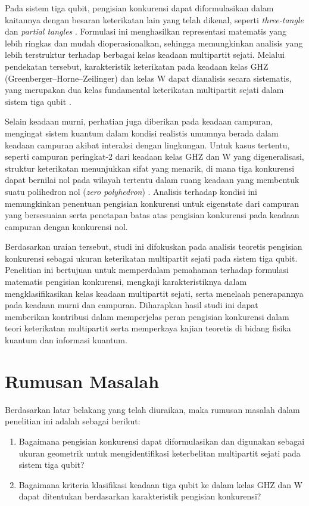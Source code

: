 \par
Pada sistem tiga qubit, pengisian konkurensi dapat diformulasikan dalam kaitannya dengan besaran keterikatan lain yang telah dikenal, seperti \textit{three-tangle} dan \textit{partial tangles} \cite{coffman2000distributed}. Formulasi ini menghasilkan representasi matematis yang lebih ringkas dan mudah dioperasionalkan, sehingga memungkinkan analisis yang lebih terstruktur terhadap berbagai kelas keadaan multipartit sejati. Melalui pendekatan tersebut, karakteristik keterikatan pada keadaan kelas GHZ (Greenberger--Horne--Zeilinger) dan kelas W dapat dianalisis secara sistematis, yang merupakan dua kelas fundamental keterikatan multipartit sejati dalam sistem tiga qubit \cite{dur2000three}.
\par
Selain keadaan murni, perhatian juga diberikan pada keadaan campuran, mengingat sistem kuantum dalam kondisi realistis umumnya berada dalam keadaan campuran akibat interaksi dengan lingkungan. Untuk kasus tertentu, seperti campuran peringkat-2 dari keadaan kelas GHZ dan W yang digeneralisasi, struktur keterikatan menunjukkan sifat yang menarik, di mana tiga konkurensi dapat bernilai nol pada wilayah tertentu dalam ruang keadaan yang membentuk suatu polihedron nol (\textit{zero polyhedron}) \cite{aggarwal2025classification}. Analisis terhadap kondisi ini memungkinkan penentuan pengisian konkurensi untuk eigenstate dari campuran yang bersesuaian serta penetapan batas atas pengisian konkurensi pada keadaan campuran dengan konkurensi nol.
\par
Berdasarkan uraian tersebut, studi ini difokuskan pada analisis teoretis pengisian konkurensi sebagai ukuran keterikatan multipartit sejati pada sistem tiga qubit. Penelitian ini bertujuan untuk memperdalam pemahaman terhadap formulasi matematis pengisian konkurensi, mengkaji karakteristiknya dalam mengklasifikasikan kelas keadaan multipartit sejati, serta menelaah penerapannya pada keadaan murni dan campuran. Diharapkan hasil studi ini dapat memberikan kontribusi dalam memperjelas peran pengisian konkurensi dalam teori keterikatan multipartit serta memperkaya kajian teoretis di bidang fisika kuantum dan informasi kuantum.

\section{Rumusan Masalah}
Berdasarkan latar belakang yang telah diuraikan, maka rumusan masalah dalam penelitian ini adalah sebagai berikut:
\begin{enumerate}
    \item Bagaimana pengisian konkurensi dapat diformulasikan dan digunakan sebagai ukuran geometrik untuk mengidentifikasi keterbelitan multipartit sejati pada sistem tiga qubit?
    \item Bagaimana kriteria klasifikasi keadaan tiga qubit ke dalam kelas GHZ dan W dapat ditentukan berdasarkan karakteristik pengisian konkurensi?
\end{enumerate}

